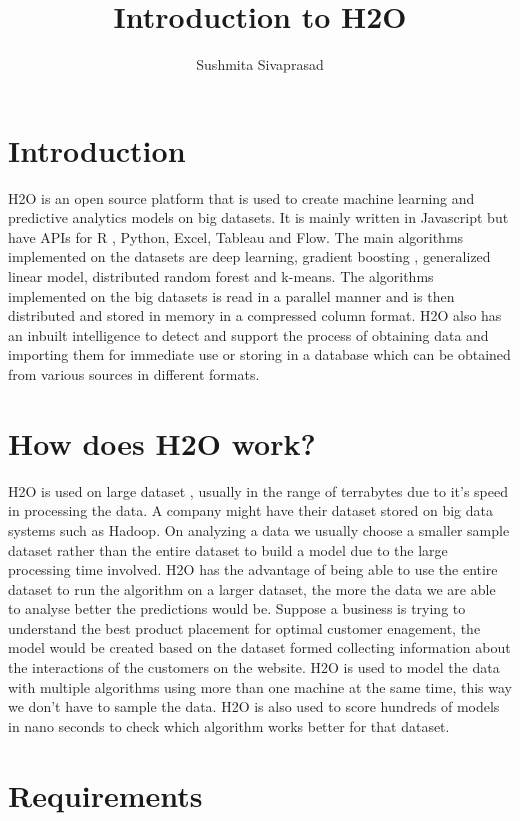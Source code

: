\documentclass[9pt,twocolumn,twoside]{../../styles/osajnl}
\title{Introduction to H2O}
\author[1]{Sushmita Sivaprasad}
\affil[1]{School of Informatics and Computing, Bloomington, IN 47408, U.S.A.}
\affil[*]{ sushsiva@umail.iu.edu}
\begin{document}
\maketitle

\section{Introduction}

H2O is an open source platform that is used to create machine learning
and predictive analytics models on big datasets. It is mainly written
in Javascript but have APIs for R , Python, Excel, Tableau and
Flow\cite{www-h2o-webpage}. The main algorithms implemented on the
datasets are deep learning, gradient boosting , generalized linear
model, distributed random forest and k-means. The algorithms
implemented on the big datasets is read in a parallel manner and is
then distributed and stored in memory in a compressed column
format. H2O also has an inbuilt intelligence to detect and support the
process of obtaining data and importing them for immediate use or
storing in a database which can be obtained from various sources in
different formats\cite{www-h2o-webpage}.


\section{How does H2O work?}

H2O is used on large dataset , usually in the range of terrabytes due
to it's speed in processing the data. A company might have their
dataset stored on big data systems such as Hadoop. On analyzing a data
we usually choose a smaller sample dataset rather than the entire
dataset to build a model due to the large processing time
involved. H2O has the advantage of being able to use the entire
dataset to run the algorithm on a larger dataset, the more the data we
are able to analyse better the predictions would
be\cite{www-h2oyoutubevideo}. Suppose a business is trying to
understand the best product placement for optimal customer enagement,
the model would be created based on the dataset formed collecting
information about the interactions of the customers on the
website. H2O is used to model the data with multiple algorithms using
more than one machine at the same time, this way we don’t have to
sample the data\cite{www-h2oyoutubevideo}. H2O is also used to score
hundreds of models in nano seconds to check which algorithm works
better for that dataset.


\section{Requirements}
\end{document}
